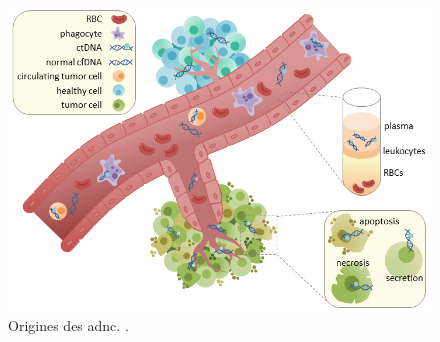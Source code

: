 \begin{figure}[H]
    \includegraphics[width=1\textwidth]{images/ctdna.png}
    \caption{Origines des \gls{adnc}. \citeauthor{racheljunewongEnglishCirculatingTumor2017} \cite{racheljunewongEnglishCirculatingTumor2017}.}
    \label{fig:ctdna}
\end{figure}

